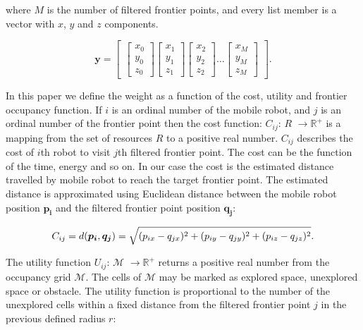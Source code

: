 \documentclass[letterpaper, 10 pt, conference]{ieeeconf}  %
\begin{document}
where $M$ is  the number of filtered frontier points, and every list member is a vector with $x$, $y$ and $z$ components. 

\begin{equation}
   \boldsymbol{y}=\begin{bmatrix}
   \begin{bmatrix}
           x_{0} \\
           y_{0} \\
           z_{0}
   \end{bmatrix}
    \begin{bmatrix}
         x_{1} \\
         y_{1} \\
         z_{1}
    \end{bmatrix}
    \begin{bmatrix}
         x_{2} \\
         y_{2} \\
         z_{2}
    \end{bmatrix}
    \hdots
    \begin{bmatrix}
         x_{M} \\
         y_{M} \\
         z_{M}
    \end{bmatrix}
\end{bmatrix}.
\end{equation}

In this paper we define the weight as a function of the cost, utility and frontier occupancy function. If $i$ is an ordinal number of the mobile robot, and $j$ is an ordinal number of the frontier point then the cost function: $C_{ij}$: $R$ \(\rightarrow \text{$\mathbb{R}^{+}$}\) is a mapping from the set of resources $R$ to a positive real number. $C_{ij}$ describes the cost of $i$th robot to visit $j$th filtered frontier point. The cost can be the function of the time,  energy and so on. In our case the cost is the estimated distance travelled by mobile robot to reach the target frontier point. The estimated distance is approximated using Euclidean distance between the mobile robot position $\boldsymbol{p_{i}}$ and the filtered frontier point position $\boldsymbol{q_{j}}$:

\begin{equation}\small
    C_{ij}=d(\boldsymbol{p_{i}}, \boldsymbol{q_{j}}) = \sqrt{(p_{ix}-q_{jx})^{2}+(p_{iy}-q_{jy})^{2}+(p_{iz}-q_{jz})^{2}}.
    \label{cost}
\end{equation}

The utility function $U_{ij}$:  \(\text{$\mathcal {M}$}\) \(\rightarrow \text{$\mathbb{R}^{+}$}\) returns a positive real number from the occupancy grid \(\text{$\mathcal {M}$}\). The cells of \(\text{$\mathcal {M}$}\) may be marked as explored space, unexplored space or obstacle. The utility function is proportional to the number of the unexplored cells within a fixed distance from the filtered frontier point $j$ in the previous defined radius $r$: 
\end{document}
